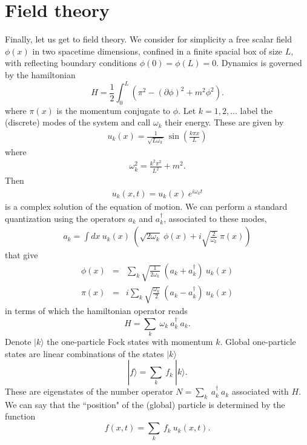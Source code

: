\documentclass[11pt, nofootinbib]{revtex4-2}
\newcommand{\be}{\begin{equation}}
\newcommand{\ee}{\end{equation}}
\newcommand{\bea}{\begin{eqnarray}}
\newcommand{\eea}{\end{eqnarray}}
\begin{document}
\section{Field theory}

Finally, let us get to field theory.  We consider for simplicity a
free scalar field $\phi(x)$ in two spacetime dimensions, confined in a
finite spacial box of size $L$, with reflecting boundary conditions
$\phi(0)=\phi(L)=0$.  Dynamics is governed by the hamiltonian  
%
\be
H = \frac{1}{2} \int_{0}^L \left(\pi^2-(\partial\phi)^2+m^2\phi^2 \right).
\ee
%
where $\pi(x)$ is the momentum conjugate to $\phi$. 
Let $k=1,2,\ldots$ label the (discrete) modes of the system and call
$\omega_{k}$ their energy. These are given by 
%
\bea 
u_{k}(x)= \frac{1}{\sqrt{L \omega_{k}}} \  
\sin \left( \frac{k \pi x}{L}
\right)
\eea
%
where 
%
\bea
\omega_{k}^2 = \frac{k^2 \pi^2}{L^2} + m^2. 
\eea
%
Then 
%
\bea 
u_k(x,t) = u_{k}(x)\ e^{i \omega_{k} t}
\eea
%
is a complex solution of the equation of motion.  We can perform a
standard quantization using the operators $a_{k}$ and $a_{k}^\dagger$,
associated to these modes,
%
\bea 
a_{k} = \int dx\ u_{k}(x) \ \left( \sqrt{2\omega_{k}}\ \phi(x)+i
\sqrt{\frac{2}{\omega_{k}}}\ \pi(x)\right)
\eea
%
that give
%
\bea 
\phi(x)&=&\sum_{k} \sqrt{\frac{1}{2\omega_{k}}}\ 
(a_{k}+a^\dagger_{k})\  
u_{k}(x)\\
\pi(x)&=& i\sum_{k} \sqrt{\frac{\omega_{k}}{2}}\ 
(a_{k}-a^\dagger_{k}) \ 
u_{k}(x)
\eea
%
in terms of which the hamiltonian operator
reads
%
\be
H = \sum_{k}\ \omega_{k}\ a^\dagger_{k}\ a_{k}.
\ee
%
Denote $|k\rangle$ the one-particle Fock states with momentum $k$. 
Global one-particle states are linear combinations of the states
$|k\rangle$ 
%
\be
|f\rangle = \sum_{k}\ f_{k}\ |k\rangle.
\ee
%
These are eigenstates of the number operator $N=\sum_{k}\
a^\dagger_{k}\ a_{k}$ associated with $H$.  We can say that the
``position" of the (global) particle is determined by the function
%
\be
f(x,t)=  \sum_{k}\ f_{k}\ u_k(x,t). 
\ee
%
\end{document}
